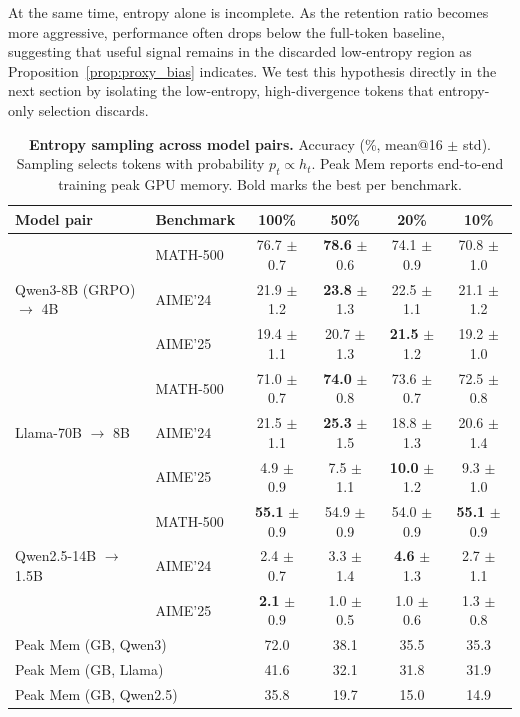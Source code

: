 \documentclass{article}
\begin{document}
At the same time, entropy alone is incomplete. As the retention ratio becomes more aggressive, performance often drops below the full-token baseline, suggesting that useful signal remains in the discarded low-entropy region as Proposition~\ref{prop:proxy_bias} indicates. We test this hypothesis directly in the next section by isolating the low-entropy, high-divergence tokens that entropy-only selection discards.


\begin{table}[t]
\centering
\caption{\textbf{Entropy sampling across model pairs.} Accuracy (\%, mean@16 $\pm$ std). Sampling selects tokens with probability $p_t \propto h_t$. Peak Mem reports end-to-end training peak GPU memory. Bold marks the best per benchmark.}
\label{tab:entropy_sweep}
\small
\begin{tabular}{l l cccc}
\toprule
Model pair & Benchmark & 100\% & 50\% & 20\% & 10\% \\
\midrule
\multirow{3}{*}{Qwen3-8B (GRPO) $\to$ 4B}
 & MATH-500 & 76.7 $\pm$ 0.7 & \textbf{78.6} $\pm$ 0.6 & 74.1 $\pm$ 0.9 & 70.8 $\pm$ 1.0 \\
 & AIME'24 & 21.9 $\pm$ 1.2 & \textbf{23.8} $\pm$ 1.3 & 22.5 $\pm$ 1.1 & 21.1 $\pm$ 1.2 \\
 & AIME'25 & 19.4 $\pm$ 1.1 & 20.7 $\pm$ 1.3 & \textbf{21.5} $\pm$ 1.2 & 19.2 $\pm$ 1.0 \\
\midrule
\multirow{3}{*}{Llama-70B $\to$ 8B}
 & MATH-500 & 71.0 $\pm$ 0.7 & \textbf{74.0} $\pm$ 0.8 & 73.6 $\pm$ 0.7 & 72.5 $\pm$ 0.8 \\
 & AIME'24 & 21.5 $\pm$ 1.1 & \textbf{25.3} $\pm$ 1.5 & 18.8 $\pm$ 1.3 & 20.6 $\pm$ 1.4 \\
 & AIME'25 & 4.9 $\pm$ 0.9 & 7.5 $\pm$ 1.1 & \textbf{10.0} $\pm$ 1.2 & 9.3 $\pm$ 1.0 \\
\midrule
\multirow{3}{*}{Qwen2.5-14B $\to$ 1.5B}
 & MATH-500 & \textbf{55.1} $\pm$ 0.9 & 54.9 $\pm$ 0.9 & 54.0 $\pm$ 0.9 & \textbf{55.1} $\pm$ 0.9 \\
 & AIME'24 & 2.4 $\pm$ 0.7 & 3.3 $\pm$ 1.4 & \textbf{4.6} $\pm$ 1.3 & 2.7 $\pm$ 1.1 \\
 & AIME'25 & \textbf{2.1} $\pm$ 0.9 & 1.0 $\pm$ 0.5 & 1.0 $\pm$ 0.6 & 1.3 $\pm$ 0.8 \\
\midrule
\multicolumn{2}{l}{Peak Mem (GB, Qwen3)} & 72.0 & 38.1 & 35.5 & 35.3 \\
\multicolumn{2}{l}{Peak Mem (GB, Llama)} & 41.6 & 32.1 & 31.8 & 31.9 \\
\multicolumn{2}{l}{Peak Mem (GB, Qwen2.5)} & 35.8 & 19.7 & 15.0 & 14.9 \\
\bottomrule
\end{tabular}
\end{table}
\end{document}
